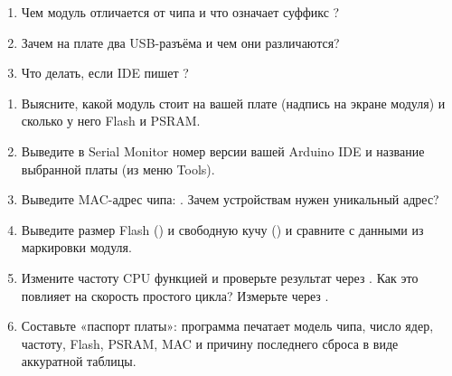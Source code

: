 \begin{selfcheck}
\begin{enumerate}
  \item Чем модуль отличается от чипа и что означает суффикс ?
  \item Зачем на плате два USB-разъёма и чем они различаются?
  \item Что делать, если IDE пишет ?
\end{enumerate}
\end{selfcheck}

\begin{tasks}
\begin{enumerate}
\item {} Выясните, какой модуль стоит на вашей плате (надпись на экране модуля) и сколько у него Flash и PSRAM.
\item {} Выведите в Serial Monitor номер версии вашей Arduino IDE и название выбранной платы (из меню Tools).
\item {} Выведите MAC-адрес чипа: . Зачем устройствам нужен уникальный адрес?
\item {} Выведите размер Flash () и свободную кучу () и сравните с данными из маркировки модуля.
\item {} Измените частоту CPU функцией  и проверьте результат через . Как это повлияет на скорость простого цикла? Измерьте через .
\item {} Составьте «паспорт платы»: программа печатает модель чипа, число ядер, частоту, Flash, PSRAM, MAC и причину последнего сброса в виде аккуратной таблицы.
\end{enumerate}
\end{tasks}
